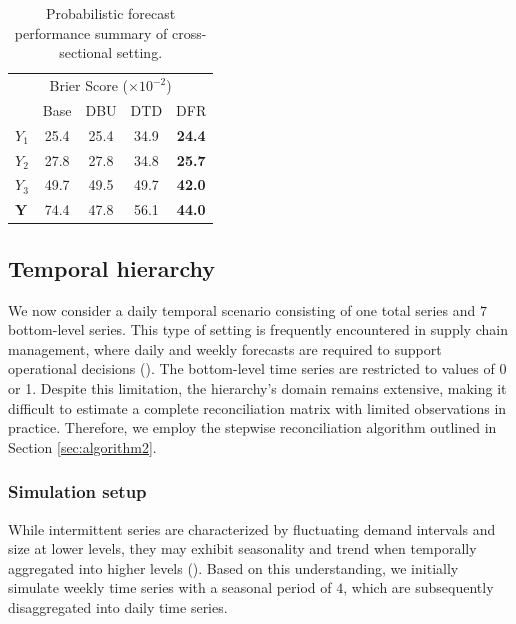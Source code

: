\documentclass[a4paper,review,12pt,authoryear]{elsarticle}
\newcommand{\bY}{\mathbf{Y}}
\begin{document}
    
    \begin{table}
      \centering
      \caption{\label{tab:sim_crosssectional_res_dist} Probabilistic forecast performance summary of cross-sectional setting.}
      \begin{tabular}{lcccc}
      \toprule
      \multicolumn{5}{c}{Brier Score ($\times 10^{-2}$)}\\ 
      & Base & DBU & DTD & DFR \\\midrule
      $Y_1$ & 25.4 & 25.4 & 34.9 & \textbf{24.4} \\
      $Y_2$ & 27.8 & 27.8 & 34.8 & \textbf{25.7}\\
      $Y_3$ & 49.7 & 49.5 & 49.7 & \textbf{42.0} \\
      $\bY$ & 74.4 & 47.8 & 56.1 & \textbf{44.0} \\
      \bottomrule
      \end{tabular} 
    \end{table}
     
     
     \subsection{Temporal hierarchy}

     We now consider a daily temporal scenario consisting of one total series and $7$ bottom-level series. 
     This type of setting is frequently encountered in supply chain management, where daily and weekly forecasts are required to support operational decisions (\citealp{syntetosSupplyChainForecasting2016}).
     The bottom-level time series are restricted to values of 0 or 1.
     Despite this limitation, the hierarchy's domain remains extensive, making it difficult to estimate a complete reconciliation matrix with limited observations in practice. 
     Therefore, we employ the stepwise reconciliation algorithm outlined in Section \ref{sec:algorithm2}. 
     
     \subsubsection{Simulation setup}
     
     While intermittent series are characterized by fluctuating demand intervals and size at lower levels, they may exhibit seasonality and trend when temporally aggregated into higher levels ().
     Based on this understanding, we initially simulate weekly time series with a seasonal period of $4$, which are subsequently disaggregated into daily time series.
     
\end{document}
